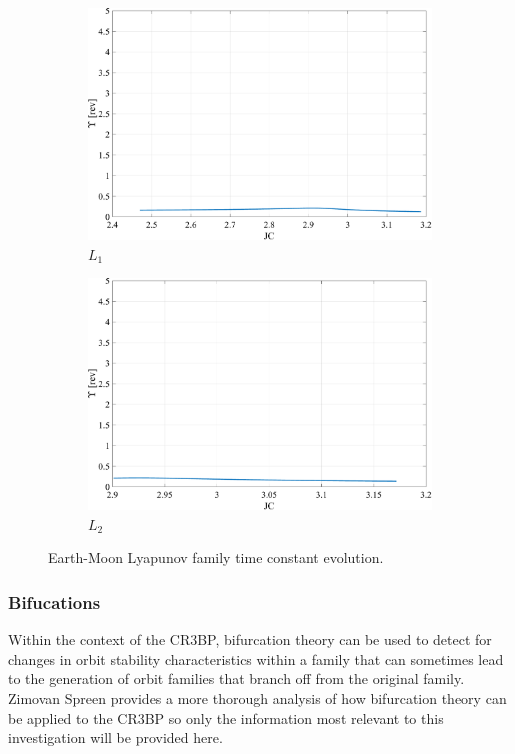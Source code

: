 \begin{figure}[ht]
    \begin{subfigure}[h]{0.4\linewidth}
        \includegraphics[width=\textwidth]{figures/L1LyapunovTimeConstant.pdf}
        \caption{$L_{1}$}
    \end{subfigure}
    \hfill
    \begin{subfigure}[h]{0.4\linewidth}
        \includegraphics[width=\textwidth]{figures/L2LyapunovTimeConstant.pdf}
        \caption{$L_{2}$}
    \end{subfigure}
    \caption{Earth-Moon Lyapunov family time constant evolution.}
    \label{fig:timeConstant}
\end{figure}

\subsubsection{Bifucations}
Within the context of the CR3BP, bifurcation theory can be used to detect for changes in orbit
stability characteristics within a family that can sometimes lead to the generation of orbit
families that branch off from the original family. Zimovan Spreen provides a more thorough
analysis of how bifurcation theory can be applied to the CR3BP so only the information most
relevant to this investigation will be provided here\cite{ZimovanSpreen:2021}.

